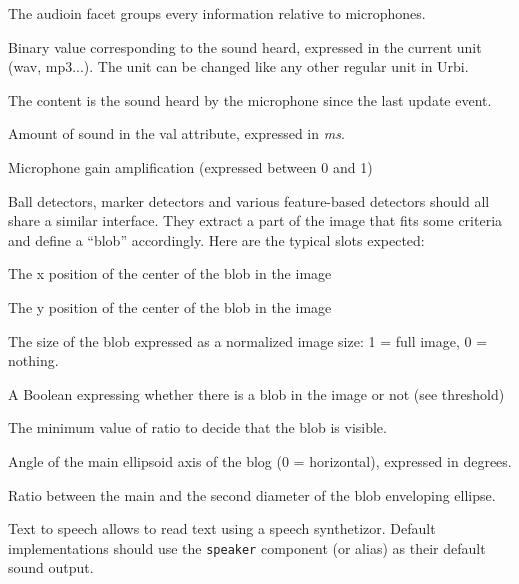
The audioin facet groups every information relative to microphones.

\begin{slots}
  {%
    Binary value corresponding to the sound heard, expressed in the
    current unit (wav, mp3...). The unit can be changed like any other
    regular unit in Urbi.

    The content is the sound heard by the microphone since the last
    update event.%
  }

  {%
    Amount of sound in the val attribute, expressed in \textit{ms}.%
  }

  {%
    Microphone gain amplification (expressed between 0 and 1)%
  }
\end{slots}



Ball detectors, marker detectors and various feature-based detectors
should all share a similar interface. They extract a part of the image
that fits some criteria and define a “blob” accordingly. Here are the
typical slots expected:

\begin{slots}
  {%
    The x position of the center of the blob in the image%
  }

  {%
    The y position of the center of the blob in the image%
  }

  {%
    The size of the blob expressed as a normalized image size: 1 =
    full image, 0 = nothing.%
  }

  {%
    A Boolean expressing whether there is a blob in the image or not
    (see threshold)%
  }

  {%
    The minimum value of ratio to decide that the blob is visible.%
  }

  {%
    Angle of the main ellipsoid axis of the blog (0 = horizontal),
    expressed in degrees.%
  }

  {%
    Ratio between the main and the second diameter of the blob
    enveloping ellipse.%
  }

\end{slots}

Text to speech allows to read text using a speech synthetizor. Default
implementations should use the \texttt{speaker} component (or alias) as
their default sound output.

